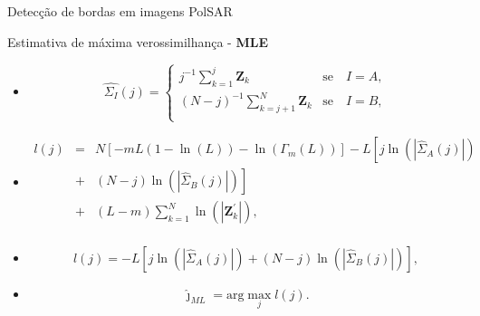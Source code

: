 \documentclass[10pt]{beamer}
\begin{document}
\begin{frame}{Detecção de bordas em imagens PolSAR}
\begin{alertblock}{Estimativa de máxima verossimilhança - \textbf{MLE}}
  \begin{itemize} \item
\begin{equation}
\widehat{\Sigma_{I}}(j) = \left\{
\begin{array}{lc}
	j^{-1}\sum_{k=1}^{j}\mathbf{Z}_{k}  & \mbox{se}\quad I=A,  \\
        (N-j)^{-1}\sum_{k=j+1}^{N}\mathbf{Z}_{k} & \mbox{se}\quad I=B, \\
\end{array}
\right.
\end{equation}
\item
\begin{equation}
\begin{array}{rcl}
	l(j)&=&N\left[-mL(1-\ln{\left(L\right)})-\ln{\left(\Gamma_m(L)\right)}\right]-L\left[j\ln{\left(|\widehat{\Sigma}_{A}(j)|\right)}\right. \\	
	&+&\left.(N-j)\ln{\left(|\widehat{\Sigma}_{B}(j)|\right)}\right] \\
	&+&(L-m)\sum_{k=1}^{N}\ln{\left(|\mathbf{Z}_{k}^{'}|\right)}, \\
\end{array}
\end{equation}
\item
\begin{equation}
	l(j)=-L\left[j\ln{\left(|\widehat{\Sigma}_{A}(j)|\right)}+(N-j)\ln{\left(|\widehat{\Sigma}_{B}(j)|\right)}\right],
\end{equation}
\item
\begin{equation}
	\widehat{\jmath}_{ML}=\text{arg}\max\limits_{j}l(j).  
\end{equation}
\end{itemize}
\end{alertblock}
\end{frame}
\end{document}
